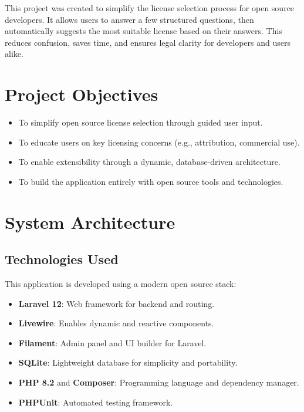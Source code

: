 \documentclass[12pt,a4paper]{report}
\begin{document}
This project was created to simplify the license selection process for open source developers. It allows users to answer a few structured questions, then automatically suggests the most suitable license based on their answers. This reduces confusion, saves time, and ensures legal clarity for developers and users alike.

\chapter{Project Objectives}
\begin{itemize}
    \item To simplify open source license selection through guided user input.
    \item To educate users on key licensing concerns (e.g., attribution, commercial use).
    \item To enable extensibility through a dynamic, database-driven architecture.
    \item To build the application entirely with open source tools and technologies.
\end{itemize}

\chapter{System Architecture}
\section{Technologies Used}
This application is developed using a modern open source stack:
\begin{itemize}
    \item \textbf{Laravel 12}: Web framework for backend and routing.
    \item \textbf{Livewire}: Enables dynamic and reactive components.
    \item \textbf{Filament}: Admin panel and UI builder for Laravel.
    \item \textbf{SQLite}: Lightweight database for simplicity and portability.
    \item \textbf{PHP 8.2} and \textbf{Composer}: Programming language and dependency manager.
    \item \textbf{PHPUnit}: Automated testing framework.
\end{itemize}
\end{document}

